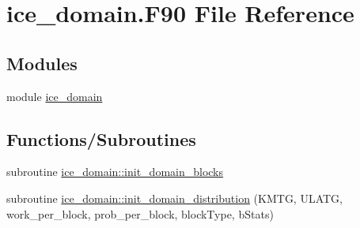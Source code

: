 \hypertarget{ice__domain_8F90}{
\section{ice\_\-domain.F90 File Reference}
\label{ice__domain_8F90}
}
\subsection*{Modules}
\begin{DoxyCompactItemize}
\item 
module \hyperlink{namespaceice__domain}{ice\_\-domain}
\end{DoxyCompactItemize}
\subsection*{Functions/Subroutines}
\begin{DoxyCompactItemize}
\item 
subroutine \hyperlink{namespaceice__domain_a110521a564e05165f28b634bd881455c}{ice\_\-domain::init\_\-domain\_\-blocks}
\item 
subroutine \hyperlink{namespaceice__domain_a1beac4cd1574f731cb07cd1f7d20f724}{ice\_\-domain::init\_\-domain\_\-distribution} (KMTG, ULATG, work\_\-per\_\-block, prob\_\-per\_\-block, blockType, bStats)
\end{DoxyCompactItemize}
